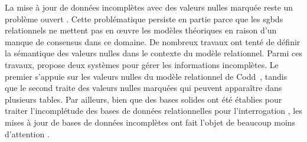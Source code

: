 La mise à jour de données incomplètes avec des valeurs nulles marquée reste un problème ouvert \cite{libkinIncompleteDataWhat2014,consoleCopingIncompleteData2020}.
Cette problématique persiste en partie parce que les \glspl{sgbd} relationnels ne mettent pas en œuvre les modèles théoriques en raison d'un manque de consensus dans ce domaine.
De nombreux travaux ont tenté de définir la sémantique des valeurs nulles dans le contexte du modèle relationnel.
Parmi ces travaux, \cite{imielinskiIncompleteInformationRelational1984} propose deux systèmes pour gérer les informations incomplètes.
Le premier s'appuie sur les valeurs nulles du modèle relationnel de Codd~\cite{coddRelationalModelData1970}, tandis que le second traite des valeurs nulles marquées qui peuvent apparaître dans plusieurs tables.
Par ailleurs, bien que des bases solides ont été établies pour traiter l'incomplétude des bases de données relationnelles pour l'interrogation \cite{zanioloDatabaseRelationsNull1984,imielinskiIncompleteInformationRelational1984,faginUpdatingLogicalDatabases1986,reiterSoundSometimesComplete1986,grahneProblemIncompleteInformation1991,bravoSemanticallyCorrectQuery2006,libkinSQLThreevaluedLogic2016,nikolaouQueryingIncompleteInformation2016,guagliardoCorrectnessSQLQueries2017}, les mises à jour de bases de données incomplètes ont fait l'objet de beaucoup moins d'attention \cite{abiteboulUpdateSemanticsIncomplete1985,faginSemanticsUpdatesDatabases1983,winslettModelbasedApproachUpdating1988,winslettUpdatingLogicalDatabases1990,degiacomoDealingInconsistenciesIncompleteness2009,degiacomoPracticalUpdateManagement2017,chabinConsistentUpdatingDatabases2020}.
